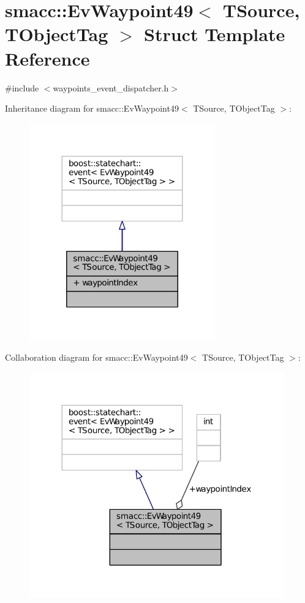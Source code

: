 \hypertarget{structsmacc_1_1EvWaypoint49}{}\section{smacc\+:\+:Ev\+Waypoint49$<$ T\+Source, T\+Object\+Tag $>$ Struct Template Reference}
\label{structsmacc_1_1EvWaypoint49}


{\ttfamily \#include $<$waypoints\+\_\+event\+\_\+dispatcher.\+h$>$}



Inheritance diagram for smacc\+:\+:Ev\+Waypoint49$<$ T\+Source, T\+Object\+Tag $>$\+:
\nopagebreak
\begin{figure}[H]
\begin{center}
\leavevmode
\includegraphics[width=227pt]{structsmacc_1_1EvWaypoint49__inherit__graph}
\end{center}
\end{figure}


Collaboration diagram for smacc\+:\+:Ev\+Waypoint49$<$ T\+Source, T\+Object\+Tag $>$\+:
\nopagebreak
\begin{figure}[H]
\begin{center}
\leavevmode
\includegraphics[width=312pt]{structsmacc_1_1EvWaypoint49__coll__graph}
\end{center}
\end{figure}
